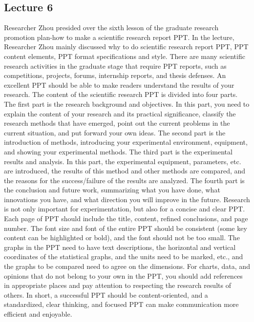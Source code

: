 \documentclass[UTF-8]{ctexart}
\begin{document}
\subsection{Lecture 6} 
Researcher Zhou presided over the sixth lesson of the graduate research promotion plan-how to make a scientific research report PPT. In the lecture, Researcher Zhou mainly discussed why to do scientific research report PPT, PPT content elements, PPT format specifications and style.
There are many scientific research activities in the graduate stage that require PPT reports, such as competitions, projects, forums, internship reports, and thesis defenses. An excellent PPT should be able to make readers understand the results of your research.
The content of the scientific research PPT is divided into four parts. The first part is the research background and objectives. In this part, you need to explain the content of your research and its practical significance, classify the research methods that have emerged, point out the current problems in the current situation, and put forward your own ideas. The second part is the introduction of methods, introducing your experimental environment, equipment, and showing your experimental methods. The third part is the experimental results and analysis. In this part, the experimental equipment, parameters, etc. are introduced, the results of this method and other methods are compared, and the reasons for the success/failure of the results are analyzed. The fourth part is the conclusion and future work, summarizing what you have done, what innovations you have, and what direction you will improve in the future.
Research is not only important for experimentation, but also for a concise and clear PPT. Each page of PPT should include the title, content, refined conclusions, and page number. The font size and font of the entire PPT should be consistent (some key content can be highlighted or bold), and the font should not be too small. The graphs in the PPT need to have text descriptions, the horizontal and vertical coordinates of the statistical graphs, and the units need to be marked, etc., and the graphs to be compared need to agree on the dimensions. For charts, data, and opinions that do not belong to your own in the PPT, you should add references in appropriate places and pay attention to respecting the research results of others. In short, a successful PPT should be content-oriented, and a standardized, clear thinking, and focused PPT can make communication more efficient and enjoyable.
\end{document}
